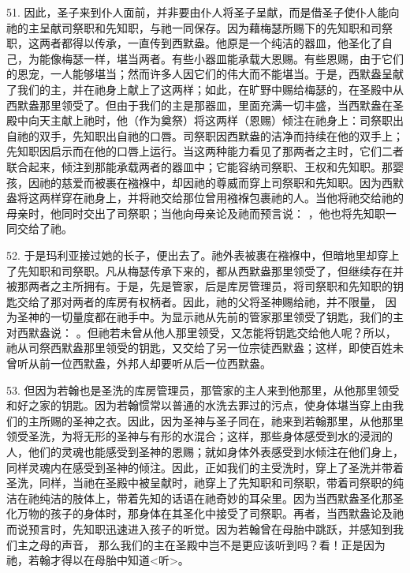 51. 因此，圣子来到仆人面前，并非要由仆人将圣子呈献，而是借圣子使仆人能向祂的主呈献司祭职和先知职，与祂一同保存。因为藉梅瑟所赐下的先知职和司祭职，这两者都得以传承，一直传到西默盎。他原是一个纯洁的器皿，他圣化了自己，为能像梅瑟一样，堪当两者。有些小器皿能承载大恩赐。有些恩赐，由于它们的恩宠，一人能够堪当；然而许多人因它们的伟大而不能堪当。于是，西默盎呈献了我们的主，并在祂身上献上了这两样；如此，在旷野中赐给梅瑟的，在圣殿中从西默盎那里领受了。但由于我们的主是那器皿，里面充满一切丰盛，当西默盎在圣殿中向天主献上祂时，他（作为奠祭）将这两样（恩赐）倾注在祂身上：司祭职出自祂的双手，先知职出自祂的口唇。司祭职因西默盎的洁净而持续在他的双手上；先知职因启示而在他的口唇上运行。当这两种能力看见了那两者之主时，它们二者联合起来，倾注到那能承载两者的器皿中；它能容纳司祭职、王权和先知职。那婴孩，因祂的慈爱而被裹在襁褓中，却因祂的尊威而穿上司祭职和先知职。因为西默盎将这两样穿在祂身上，并将祂交给那位曾用襁褓包裹祂的人。当他将祂交给祂的母亲时，他同时交出了司祭职；当他向母亲论及祂而预言说：  ，他也将先知职一同交给了祂。\par

52. 于是玛利亚接过她的长子，便出去了。祂外表被裹在襁褓中，但暗地里却穿上了先知职和司祭职。凡从梅瑟传承下来的，都从西默盎那里领受了，但继续存在并被那两者之主所拥有。于是，先是管家，后是库房管理员，将司祭职和先知职的钥匙交给了那对两者的库房有权柄者。因此，祂的父将圣神赐给祂，并不限量， 因为圣神的一切量度都在祂手中。为显示祂从先前的管家那里领受了钥匙，我们的主对西默盎说：  。但祂若未曾从他人那里领受，又怎能将钥匙交给他人呢？所以，祂从司祭西默盎那里领受的钥匙，又交给了另一位宗徒西默盎；这样，即使百姓未曾听从前一位西默盎，外邦人却要听从后一位西默盎。\par

53. 但因为若翰也是圣洗的库房管理员，那管家的主人来到他那里，从他那里领受和好之家的钥匙。因为若翰惯常以普通的水洗去罪过的污点，使身体堪当穿上由我们的主所赐的圣神之衣。因此，因为圣神与圣子同在，祂来到若翰那里，从他那里领受圣洗，为将无形的圣神与有形的水混合；这样，那些身体感受到水的浸润的人，他们的灵魂也能感受到圣神的恩赐；就如身体外表感受到水倾注在他们身上，同样灵魂内在感受到圣神的倾注。因此，正如我们的主受洗时，穿上了圣洗并带着圣洗，同样，当祂在圣殿中被呈献时，祂穿上了先知职和司祭职，带着司祭职的纯洁在祂纯洁的肢体上，带着先知的话语在祂奇妙的耳朵里。因为当西默盎圣化那圣化万物的孩子的身体时，那身体在其圣化中接受了司祭职。再者，当西默盎论及祂而说预言时，先知职迅速进入孩子的听觉。因为若翰曾在母胎中跳跃，并感知到我们主之母的声音， 那么我们的主在圣殿中岂不是更应该听到吗？看！正是因为祂，若翰才得以在母胎中知道<听>。\par


